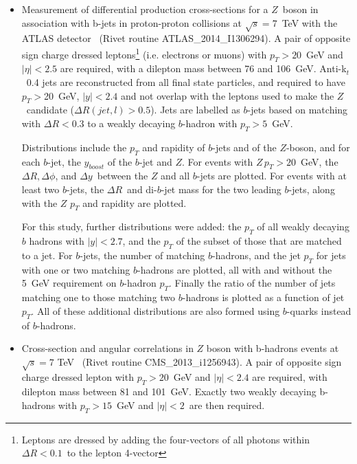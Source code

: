 \documentclass[11pt]{cernrep}
\newcommand{\pt}{\ensuremath{p_{T}}\xspace}
\begin{document}
\begin{itemize}
\item Measurement of differential production cross-sections for a $Z$\ boson
  in association with b-jets in proton-proton collisions at $\sqrt{s} =
  7$~TeV with the ATLAS detector~\cite{Aad:2014dvb} (Rivet routine
  ATLAS\_2014\_I1306294). A pair of opposite sign charge dressed
  leptons\footnote{Leptons are dressed by adding the four-vectors of all
    photons within $\Delta R<0.1$\ to the lepton 4-vector} (i.e. electrons or
  muons) with $\pt>20$~GeV and $|\eta|<2.5$ are required, with a dilepton
  mass between 76 and 106~GeV. Anti-k$_{t}$\ 0.4 jets are reconstructed from
  all final state particles, and required to have $\pt>$20~GeV, $|y|<2.4$ and
  not overlap with the leptons used to make the $Z$~candidate ($\Delta R(jet,
  l)> 0.5$). Jets are labelled as $b$-jets based on matching with $\Delta
  R<0.3$ to a weakly decaying $b$-hadron with $\pt>5$~GeV.

  Distributions include the \pt and rapidity of $b$-jets and of the
  $Z$-boson, and for each $b$-jet, the $y_{boost}$ of the $b$-jet and
  $Z$. For events with $Z\, \pt>20$~GeV, the $\Delta R, \Delta\phi$, and
  $\Delta y$\ between the $Z$ and all $b$-jets are plotted. For events with
  at least two $b$-jets, the $\Delta R$\ and di-$b$-jet mass for the two
  leading $b$-jets, along with the $Z$ \pt and rapidity are plotted.

  For this study, further distributions were added: the \pt of all weakly
  decaying $b$ hadrons with $|y|<2.7$, and the \pt of the subset of those
  that are matched to a jet. For $b$-jets, the number of matching
  $b$-hadrons, and the jet \pt for jets with one or two matching $b$-hadrons
  are plotted, all with and without the 5~GeV requirement on $b$-hadron
  \pt. Finally the ratio of the number of jets matching one to those matching
  two $b$-hadrons is plotted as a function of jet \pt. All of these
  additional distributions are also formed using $b$-quarks instead of
  $b$-hadrons.
  
\item Cross-section and angular correlations in $Z$ boson with b-hadrons
  events at $\sqrt{s} = 7$ TeV~\cite{Chatrchyan:2013zja} (Rivet routine
  CMS\_2013\_i1256943). A pair of opposite sign charge dressed lepton with
  $\pt>20$~GeV and $|\eta|<2.4$ are required, with dilepton mass between 81
  and 101~GeV. Exactly two weakly decaying b-hadrons with $\pt>15$~GeV and
  $|\eta|<2$\ are then required.


\end{itemize}
\end{document}
